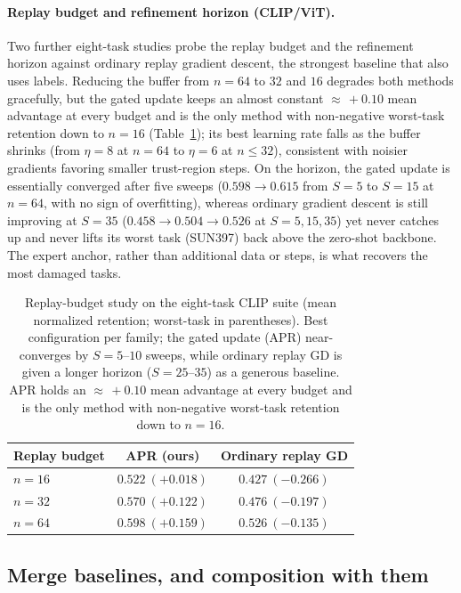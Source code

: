 \documentclass[11pt]{article}
\begin{document}
\paragraph{Replay budget and refinement horizon (CLIP/ViT).}
Two further eight-task studies probe the replay budget and the refinement horizon against ordinary replay gradient descent, the strongest baseline that also uses labels. Reducing the buffer from $n=64$ to $32$ and $16$ degrades both methods gracefully, but the gated update keeps an almost constant ${\approx}\,+0.10$ mean advantage at every budget and is the only method with non-negative worst-task retention down to $n=16$ (Table~\ref{tab:clipbudget}); its best learning rate falls as the buffer shrinks (from $\eta=8$ at $n=64$ to $\eta=6$ at $n\le 32$), consistent with noisier gradients favoring smaller trust-region steps. On the horizon, the gated update is essentially converged after five sweeps ($0.598\to0.615$ from $S=5$ to $S=15$ at $n=64$, with no sign of overfitting), whereas ordinary gradient descent is still improving at $S=35$ ($0.458\to0.504\to0.526$ at $S=5,15,35$) yet never catches up and never lifts its worst task (SUN397) back above the zero-shot backbone. The expert anchor, rather than additional data or steps, is what recovers the most damaged tasks.

\begin{table}[t]
\centering
\caption{Replay-budget study on the eight-task CLIP suite (mean normalized retention; worst-task in parentheses). Best configuration per family; the gated update (APR) near-converges by $S=5\text{--}10$ sweeps, while ordinary replay GD is given a longer horizon ($S=25\text{--}35$) as a generous baseline. APR holds an ${\approx}\,+0.10$ mean advantage at every budget and is the only method with non-negative worst-task retention down to $n=16$.}
\label{tab:clipbudget}
\begin{tabular}{lcc}
\toprule
Replay budget & \textbf{APR (ours)} & Ordinary replay GD \\
\midrule
$n=16$ & $\mathbf{0.522}\ (\mathbf{+0.018})$ & $0.427\ (-0.266)$ \\
$n=32$ & $\mathbf{0.570}\ (\mathbf{+0.122})$ & $0.476\ (-0.197)$ \\
$n=64$ & $\mathbf{0.598}\ (\mathbf{+0.159})$ & $0.526\ (-0.135)$ \\
\bottomrule
\end{tabular}
\end{table}

\subsection{Merge baselines, and composition with them}
\label{sec:mergebaselines}
\end{document}
